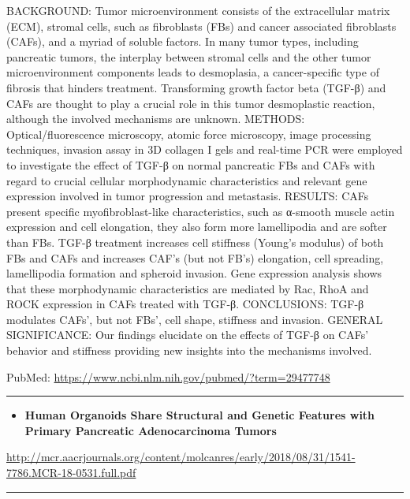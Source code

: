 \documentclass[]{article}
\providecommand{\tightlist}{%
  \setlength{\itemsep}{0pt}\setlength{\parskip}{0pt}}
\begin{document}
BACKGROUND: Tumor microenvironment consists of the extracellular matrix
(ECM), stromal cells, such as fibroblasts (FBs) and cancer associated
fibroblasts (CAFs), and a myriad of soluble factors. In many tumor
types, including pancreatic tumors, the interplay between stromal cells
and the other tumor microenvironment components leads to desmoplasia, a
cancer-specific type of fibrosis that hinders treatment. Transforming
growth factor beta (TGF-β) and CAFs are thought to play a crucial role
in this tumor desmoplastic reaction, although the involved mechanisms
are unknown. METHODS: Optical/fluorescence microscopy, atomic force
microscopy, image processing techniques, invasion assay in 3D collagen I
gels and real-time PCR were employed to investigate the effect of TGF-β
on normal pancreatic FBs and CAFs with regard to crucial cellular
morphodynamic characteristics and relevant gene expression involved in
tumor progression and metastasis. RESULTS: CAFs present specific
myofibroblast-like characteristics, such as α-smooth muscle actin
expression and cell elongation, they also form more lamellipodia and are
softer than FBs. TGF-β treatment increases cell stiffness (Young's
modulus) of both FBs and CAFs and increases CAF's (but not FB's)
elongation, cell spreading, lamellipodia formation and spheroid
invasion. Gene expression analysis shows that these morphodynamic
characteristics are mediated by Rac, RhoA and ROCK expression in CAFs
treated with TGF-β. CONCLUSIONS: TGF-β modulates CAFs', but not FBs',
cell shape, stiffness and invasion. GENERAL SIGNIFICANCE: Our findings
elucidate on the effects of TGF-β on CAFs' behavior and stiffness
providing new insights into the mechanisms involved.

PubMed: \url{https://www.ncbi.nlm.nih.gov/pubmed/?term=29477748}

{}

{}

\begin{center}\rule{0.5\linewidth}{\linethickness}\end{center}

\begin{itemize}
\tightlist
\item
  \textbf{Human Organoids Share Structural and Genetic Features with
  Primary Pancreatic Adenocarcinoma Tumors}
\end{itemize}

\url{http://mcr.aacrjournals.org/content/molcanres/early/2018/08/31/1541-7786.MCR-18-0531.full.pdf}

\begin{center}\rule{0.5\linewidth}{\linethickness}\end{center}
\end{document}
